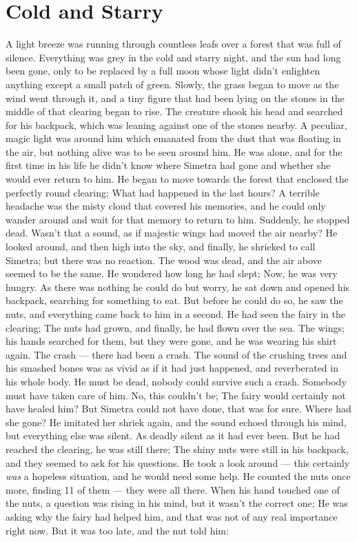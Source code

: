 \chapter{Cold and Starry}
\label{cha:cold-starry}
A light breeze was running through countless leafs over a forest that was full of silence. Everything was grey in the cold and starry night, and the sun had long been gone, only to be replaced by a full moon whose light didn't enlighten anything except a small patch of green. Slowly, the grass began to move as the wind went through it, and a tiny figure that had been lying on the stones in the middle of that clearing began to rise. The creature shook his head and searched for his backpack, which was leaning against one of the stones nearby. A peculiar, magic light was around him which emanated from the dust that was floating in the air, but nothing alive was to be seen around him. 
He was alone, and for the first time in his life he didn't know where Simetra had gone and whether she would ever return to him. 
He began to move towards the forest that enclosed the perfectly round clearing; What had happened in the last hours? A terrible headache was the misty cloud that covered his memories, and he could only wander around and wait for that memory to return to him. Suddenly, he stopped dead. Wasn't that a sound, as if majestic wings had moved the air nearby? He looked around, and then high into the sky, and finally, he shrieked to call Simetra; but there was no reaction. The wood was dead, and the air above seemed to be the same. 
He wondered how long he had slept; Now, he was very hungry. As there was nothing he could do but worry, he sat down and opened his backpack, searching for something to eat. But before he could do so, he saw the nuts, and everything came back to him in a second. He had seen the fairy in the clearing; The nuts had grown, and finally, he had flown over the sea. The wings; his hands searched for them, but they were gone, and he was wearing his shirt again. The crash --- there had been a crash. The sound of the crushing trees and his smashed bones was as vivid as if it had just happened, and reverberated in his whole body. He must be dead, nobody could survive such a crash. 
Somebody must have taken care of him. 
No, this couldn't be; The fairy would certainly not have healed him? But Simetra could not have done, that was for sure. Where had she gone? 
He imitated her shriek again, and the sound echoed through his mind, but everything else was silent. 
As deadly silent as it had ever been. But he had reached the clearing, he was still there; The shiny nuts were still in his backpack, and they seemed to ask for his questions. He took a look around --- this certainly \emph{was} a hopeless situation, and he would need some help. He counted the nuts once more, finding 11 of them --- they were all there. When his hand touched one of the nuts, a question was rising in his mind, but it wasn't the correct one; He was asking why the fairy had helped him, and that was not of any real importance right now. But it was too late, and the nut told him: 
